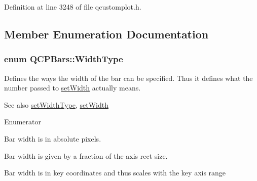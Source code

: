 Definition at line 3248 of file qcustomplot.\+h.



\subsection{Member Enumeration Documentation}
\hypertarget{class_q_c_p_bars_a65dbbf1ab41cbe993d71521096ed4649}{}
\subsubsection[{Width\+Type}]{\setlength{\rightskip}{0pt plus 5cm}enum {\bf Q\+C\+P\+Bars\+::\+Width\+Type}}\label{class_q_c_p_bars_a65dbbf1ab41cbe993d71521096ed4649}
Defines the ways the width of the bar can be specified. Thus it defines what the number passed to \hyperlink{class_q_c_p_bars_afec6116579d44d5b706e0fa5e5332507}{set\+Width} actually means.

\begin{DoxySeeAlso}{See also}
\hyperlink{class_q_c_p_bars_adcaa3b41281bb2c0f7949b341592fcc0}{set\+Width\+Type}, \hyperlink{class_q_c_p_bars_afec6116579d44d5b706e0fa5e5332507}{set\+Width} 
\end{DoxySeeAlso}
\begin{Desc}
\item[Enumerator]\par
\begin{description}
\item[{\em 
\hypertarget{class_q_c_p_bars_a65dbbf1ab41cbe993d71521096ed4649ab74315c9aa77df593c58dd25dfc0de35}{}wt\+Absolute\label{class_q_c_p_bars_a65dbbf1ab41cbe993d71521096ed4649ab74315c9aa77df593c58dd25dfc0de35}
}]Bar width is in absolute pixels. \item[{\em 
\hypertarget{class_q_c_p_bars_a65dbbf1ab41cbe993d71521096ed4649a90bc09899361ad3422ff277f7c790ffe}{}wt\+Axis\+Rect\+Ratio\label{class_q_c_p_bars_a65dbbf1ab41cbe993d71521096ed4649a90bc09899361ad3422ff277f7c790ffe}
}]Bar width is given by a fraction of the axis rect size. \item[{\em 
\hypertarget{class_q_c_p_bars_a65dbbf1ab41cbe993d71521096ed4649aad3cc60ae1bfb1160a30237bee9eaf10}{}wt\+Plot\+Coords\label{class_q_c_p_bars_a65dbbf1ab41cbe993d71521096ed4649aad3cc60ae1bfb1160a30237bee9eaf10}
}]Bar width is in key coordinates and thus scales with the key axis range \end{description}
\end{Desc}


